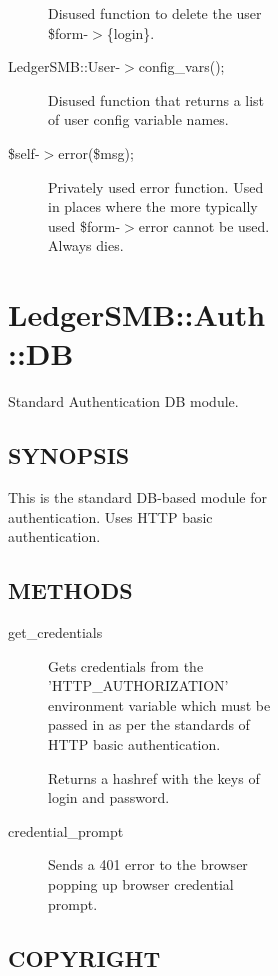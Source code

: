 \begin{description}
\begin{description}
\begin{description}
\begin{description}
\begin{description}
\begin{description}
\begin{description}
Disused function to delete the user \$form-$>$\{login\}.


\item[{LedgerSMB::User-$>$config\_vars();}] \mbox{}

Disused function that returns a list of user config variable names.


\item[{\$self-$>$error(\$msg);}] \mbox{}

Privately used error function.  Used in places where the more typically used
\$form-$>$error cannot be used.  Always dies.

\end{description}
\section{LedgerSMB::Auth::DB\label{LedgerSMB::Auth::DB}}


Standard Authentication DB module.

\subsection*{SYNOPSIS\label{LedgerSMB::Auth::DB_SYNOPSIS}}


This is the standard DB-based module for authentication.  Uses HTTP basic 
authentication.

\subsection*{METHODS\label{LedgerSMB::Auth::DB_METHODS}}
\begin{description}

\item[{get\_credentials}] \mbox{}

Gets credentials from the 'HTTP\_AUTHORIZATION' environment variable which must
be passed in as per the standards of HTTP basic authentication.



Returns a hashref with the keys of login and password.


\item[{credential\_prompt}] \mbox{}

Sends a 401 error to the browser popping up browser credential prompt.

\end{description}
\subsection*{COPYRIGHT\label{LedgerSMB::Auth::DB_COPYRIGHT}}



\end{description}
\end{description}
\end{description}
\end{description}
\end{description}
\end{description}
